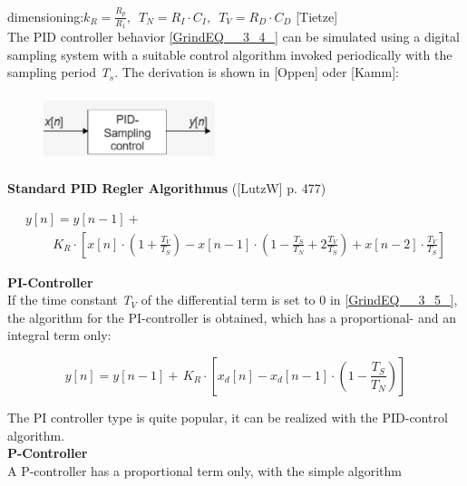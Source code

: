 dimensioning:$k_{R} =\frac{R_{p} }{R_{1} } ,\, \, \, T_{N} =R_{I} \cdot C_{I} ,\, \, \, T_{V} =R_{D} \cdot C_{D} $     [Tietze]\\

The PID controller behavior \eqref{GrindEQ__3_4_} can be simulated using a digital sampling system with a suitable control algorithm invoked periodically with the sampling period \textit{T${}_{s}$}. The derivation is shown in [Oppen] oder [Kamm]:

	\begin{figure}[h]
    \centering
    \includegraphics[width=5cm, height=2cm]{Images/image150.png}
    \label{fig:Fig 103}
    \end{figure}

\textbf{Standard PID Regler Algorithmus}  ([LutzW] p. 477)

\begin{equation}
	\begin{array}{l} {y[n]=y[n-1]+} \\ {\, \, \, \, \, \, \, \, \, \, \, \, \, K_{R} \cdot \left[x[n]\cdot \left(1+\frac{T_{V} }{T_{S} } \right)-x[n-1]\cdot \left(1-\frac{T_{S} }{T_{N} } +2\frac{T_{V} }{T_{S} } \right)+x[n-2]\cdot \frac{T_{V} }{T_{S} } \right]} \end{array}
\label{EQ }
\end{equation}

{\rot\bf PI-Controller }\\

If the time constant \textit{T${}_{V}$} of the differential term is set to 0 in \eqref{GrindEQ__3_5_}, the algorithm for the PI-controller is obtained, which has a proportional- and an integral term only:

\begin{equation}
	y[n]=y[n-1]+\, K_{R} \cdot \left[x_{d} [n]-x_{d} [n-1]\cdot \left(1-\frac{T_{S} }{T_{N} } \right)\right]
\label{EQ }
\end{equation}

The PI controller type is quite popular, it can be realized with the PID-control algorithm. \\

{\rot\bf P-Controller}\\

A P-controller has a proportional term only, with the simple algorithm

